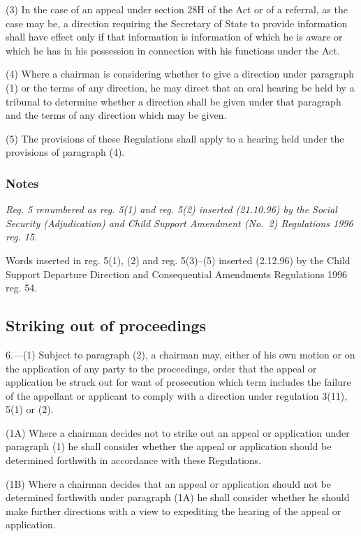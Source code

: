 \documentclass[a4paper]{article}
\newcommand\amendment[1]{\subsubsection*{Notes}{\itshape\frenchspacing\footnotesize #1 \par}}
\begin{document}
(3) In the case of an appeal under section 28H of the Act or of a referral, as the case may be, a direction requiring the Secretary of State to provide information shall have effect only if that information is information of which he is aware or which he has in his possession in connection with his functions under the Act.

(4) Where a chairman is considering whether to give a direction under paragraph (1) or the terms of any direction, he may direct that an oral hearing be held by a tribunal to determine whether a direction shall be given under that paragraph and the terms of any direction which may be given.

(5) The provisions of these Regulations shall apply to a hearing held under the provisions of paragraph (4).

\amendment{
Reg. 5 renumbered as reg. 5(1) and reg. 5(2) inserted (21.10.96) by the Social Security (Adjudication) and Child Support Amendment (No.\ 2) Regulations 1996 reg. 15.

Words inserted in reg. 5(1), (2) and reg. 5(3)--(5) inserted (2.12.96) by the Child Support Departure Direction and Consequential Amendments Regulations 1996 reg. 54.
}

\subsection[6. Striking out of proceedings]{Striking out of proceedings}

6.—(1) Subject to paragraph (2), a chairman may, either of his own motion or on the application of any party to the proceedings, order that the appeal or application be struck out 
for want of prosecution which term includes  %
the failure of the appellant or applicant to comply with 
a direction under regulation 3(11), 5(1) or (2).  %

(1A) Where a chairman decides not to strike out an appeal or application under paragraph (1) he shall consider whether the appeal or application should be determined forthwith in accordance with these Regulations.

(1B) Where a chairman decides that an appeal or application should not be determined forthwith under paragraph (1A) he shall consider whether he should make further directions with a view to expediting the hearing of the appeal or application.
\end{document}
